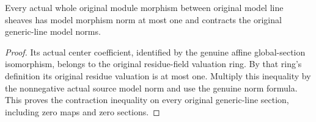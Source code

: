 \begin{lemma}
\label{lem:scheme-line-actual-model-morphism-contractive}
\leanok
{}
Every actual whole original module morphism between original model
line sheaves has model morphism norm at most one and contracts the
original generic-line model norms.
\end{lemma}
\begin{proof}
Its actual center coefficient, identified by the genuine affine
global-section isomorphism, belongs to the original residue-field
valuation ring. By that ring's definition its original residue
valuation is at most one. Multiply this inequality by the
nonnegative actual source model norm and use the genuine norm
formula. This proves the contraction inequality on every original
generic-line section, including zero maps and zero sections.
\end{proof}
